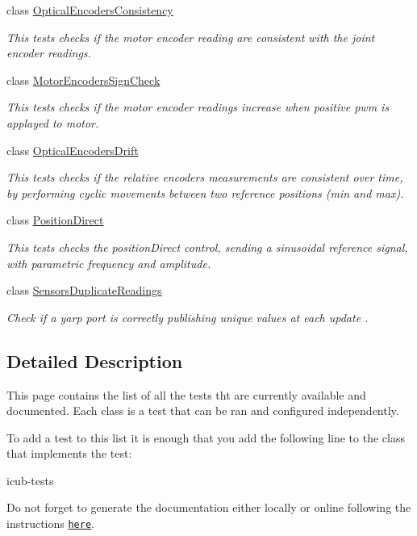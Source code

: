 \begin{DoxyCompactItemize}
class \hyperlink{classOpticalEncodersConsistency}{Optical\-Encoders\-Consistency}
\begin{DoxyCompactList}\small\item\em This tests checks if the motor encoder reading are consistent with the joint encoder readings. \end{DoxyCompactList}\item 
class \hyperlink{classMotorEncodersSignCheck}{Motor\-Encoders\-Sign\-Check}
\begin{DoxyCompactList}\small\item\em This tests checks if the motor encoder readings increase when positive pwm is applayed to motor. \end{DoxyCompactList}\item 
class \hyperlink{classOpticalEncodersDrift}{Optical\-Encoders\-Drift}
\begin{DoxyCompactList}\small\item\em This tests checks if the relative encoders measurements are consistent over time, by performing cyclic movements between two reference positions (min and max). \end{DoxyCompactList}\item 
class \hyperlink{classPositionDirect}{Position\-Direct}
\begin{DoxyCompactList}\small\item\em This tests checks the position\-Direct control, sending a sinusoidal reference signal, with parametric frequency and amplitude. \end{DoxyCompactList}\item 
class \hyperlink{classSensorsDuplicateReadings}{Sensors\-Duplicate\-Readings}
\begin{DoxyCompactList}\small\item\em Check if a yarp port is correctly publishing unique values at each update . \end{DoxyCompactList}\end{DoxyCompactItemize}


\subsection{Detailed Description}
This page contains the list of all the tests tht are currently available and documented. Each class is a test that can be ran and configured independently.

To add a test to this list it is enough that you add the following line to the class that implements the test\-:

\begin{DoxyVerb}\ingroup icub-tests\end{DoxyVerb}


Do not forget to generate the documentation either locally or online following the instructions \href{https://github.com/robotology/icub-tests/}{\tt here}. 